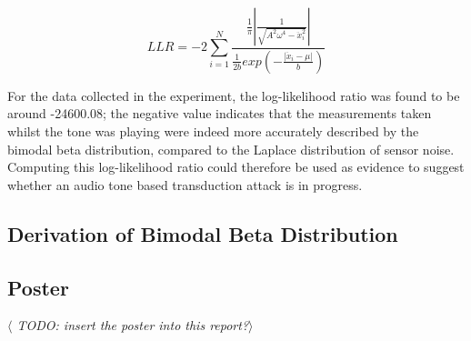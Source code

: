 \documentclass[12pt]{article}
\begin{document}
\begin{appendix}
      \begin{equation}
        LLR = -2 \sum_{i = 1}^{N} \frac{\frac{1}{\pi}\left| \frac{1}{\sqrt{A^2\omega^4 - \ddot{x}_i^2}} \right|}{\frac{1}{2b} exp\left(-\frac{|\ddot{x}_i-\mu|}{b}\right)}
      \end{equation}

      For the data collected in the experiment, the log-likelihood ratio was found to be around -24600.08; the negative value indicates that the measurements taken whilst the tone was playing were indeed more accurately described by the bimodal beta distribution, compared to the Laplace distribution of sensor noise. Computing this log-likelihood ratio could therefore be used as evidence to suggest whether an audio tone based transduction attack is in progress.

    \subsection{Derivation of Bimodal Beta Distribution} \label{Poster_Derivation}

    \subsection{Poster}
      \textit{$\langle$ TODO: insert the poster into this report?$\rangle$}

\end{appendix}
\end{document}
